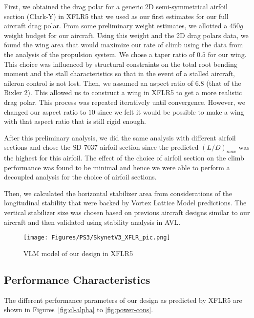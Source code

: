 \documentclass[11pt]{article}
\begin{document}
First, we obtained the drag polar for a generic 2D semi-symmetrical airfoil section (Clark-Y) in XFLR5 that we used as our first estimates for our full aircraft drag polar. From some preliminary weight estimates, we allotted a $450g$ weight budget for our aircraft. Using this weight and the 2D drag polars data, we found the wing area that would maximize our rate of climb using the data from the analysis of the propulsion system. We chose a taper ratio of $0.5$ for our wing. This choice was influenced by structural constraints on the total root bending moment and the stall characteristics so that in the event of a stalled aircraft, aileron control is not lost. Then, we assumed an aspect ratio of $6.8$ (that of the Bixler 2). This allowed us to construct a wing in XFLR5 to get a more realistic drag polar. This process was repeated iteratively until convergence. However, we changed our aspect ratio to $10$ since we felt it would be possible to make a wing with that aspect ratio that is still rigid enough.

After this preliminary analysis, we did the same analysis with different airfoil sections and chose the SD-7037 airfoil section since the predicted $(L/D)_{max}$ was the highest for this airfoil. The effect of the choice of airfoil section on the climb performance was found to be minimal and hence we were able to perform a decoupled analysis for the choice of airfoil sections.

Then, we calculated the horizontal stabilizer area from considerations of the longitudinal stability that were backed by Vortex Lattice Model predictions. The vertical stabilizer size was chosen based on previous aircraft designs similar to our aircraft and then validated using stability analysis in AVL.

\begin{figure}[h!]
  \centering
  \texttt{[image: Figures/PS3/SkynetV3\_XFLR\_pic.png]}
  \caption{VLM model of our design in XFLR5}\label{fig:vlm-design}
\end{figure}

\subsection{Performance Characteristics}
\label{PerfChar}

The different performance parameters of our design as predicted by XFLR5 are shown in Figures~\ref{fig:cl-alpha} to \ref{fig:power-cons}.
\end{document}
